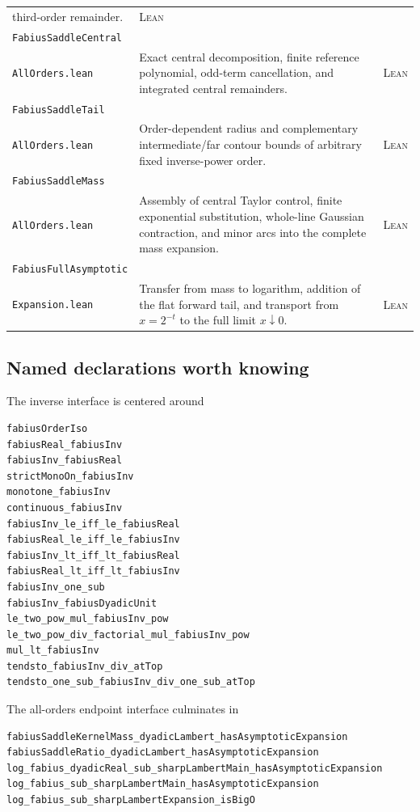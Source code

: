 \documentclass[11pt,oneside]{article}
\theoremstyle{definition}
\theoremstyle{remark}
\newcommand{\Formalized}{\textsc{Lean}}
\begin{document}
\begin{longtable}{>{\raggedright\arraybackslash}p{}
                  >{\raggedright\arraybackslash}p{}
                  >{\raggedright\arraybackslash}p{}}
third-order remainder. & \Formalized\\
\texttt{FabiusSaddleCentral}\\\texttt{AllOrders.lean} &
Exact central decomposition, finite reference polynomial, odd-term
cancellation, and integrated central remainders. & \Formalized\\
\texttt{FabiusSaddleTail}\\\texttt{AllOrders.lean} &
Order-dependent radius and complementary intermediate/far contour bounds
of arbitrary fixed inverse-power order. & \Formalized\\
\texttt{FabiusSaddleMass}\\\texttt{AllOrders.lean} &
Assembly of central Taylor control, finite exponential substitution,
whole-line Gaussian contraction, and minor arcs into the complete mass
expansion. & \Formalized\\
\texttt{FabiusFullAsymptotic}\\\texttt{Expansion.lean} &
Transfer from mass to logarithm, addition of the flat forward tail, and
transport from $x=2^{-t}$ to the full limit $x\downarrow0$. & \Formalized\\
\bottomrule
\end{longtable}
\endgroup

\subsection{Named declarations worth knowing}

The inverse interface is centered around
\begin{lstlisting}[style=pseudo]
fabiusOrderIso
fabiusReal_fabiusInv
fabiusInv_fabiusReal
strictMonoOn_fabiusInv
monotone_fabiusInv
continuous_fabiusInv
fabiusInv_le_iff_le_fabiusReal
fabiusReal_le_iff_le_fabiusInv
fabiusInv_lt_iff_lt_fabiusReal
fabiusReal_lt_iff_lt_fabiusInv
fabiusInv_one_sub
fabiusInv_fabiusDyadicUnit
le_two_pow_mul_fabiusInv_pow
le_two_pow_div_factorial_mul_fabiusInv_pow
mul_lt_fabiusInv
tendsto_fabiusInv_div_atTop
tendsto_one_sub_fabiusInv_div_one_sub_atTop
\end{lstlisting}
The all-orders endpoint interface culminates in
\begin{lstlisting}[style=pseudo]
fabiusSaddleKernelMass_dyadicLambert_hasAsymptoticExpansion
fabiusSaddleRatio_dyadicLambert_hasAsymptoticExpansion
log_fabius_dyadicReal_sub_sharpLambertMain_hasAsymptoticExpansion
log_fabius_sub_sharpLambertMain_hasAsymptoticExpansion
log_fabius_sub_sharpLambertExpansion_isBigO
\end{lstlisting}
\end{document}
